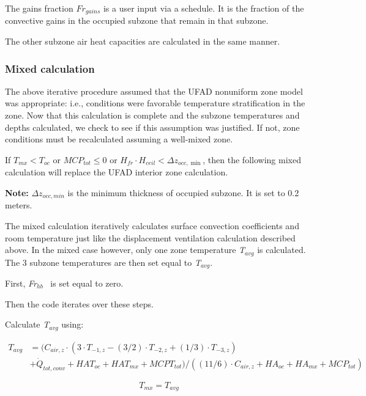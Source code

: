 The gains fraction \(F{r_{gains}}\) is a user input via a schedule. It is the fraction of the convective gains in the occupied subzone that remain in that subzone.

The other subzone air heat capacities are calculated in the same manner.

\subsubsection{Mixed calculation}\label{mixed-calculation-1}

The above iterative procedure assumed that the UFAD nonuniform zone model was appropriate: i.e., conditions were favorable temperature stratification in the zone. Now that this calculation is complete and the subzone temperatures and depths calculated, we check to see if this assumption was justified. If not, zone conditions must be recalculated assuming a well-mixed zone.

If \({T_{mx}} < {T_{oc}}\) or \(MC{P_{tot}} \le 0\) or \({H_{fr}} \cdot {H_{ceil}} < \Delta {z_{occ,\min }}\), then the following mixed calculation will replace the UFAD interior zone calculation.

\textbf{Note:} \(\Delta {z_{occ,min}}\) is the minimum thickness of occupied subzone. It is set to 0.2 meters.

The mixed calculation iteratively calculates surface convection coefficients and room temperature just like the displacement ventilation calculation described above. In the mixed case however, only one zone temperature \emph{T\(_{avg}\)} is calculated. The 3 subzone temperatures are then set equal to \emph{T\(_{avg}\)}.

First, \emph{Fr\(_{hb}\)}~ is set equal to zero.

Then the code iterates over these steps.

Calculate \emph{T\(_{avg}\)} using:

\begin{equation}
  \begin{array}{rl}
    T_{avg} &= ({C_{air,z}} \cdot (3 \cdot {T_{ - 1,z}} - (3/2) \cdot {T_{ - 2,z}} + (1/3) \cdot {T_{ - 3,z}}) \\
            &+ {{\dot Q}_{tot,conv}} + HA{T_{oc}} + HA{T_{mx}} + MCP{T_{tot}})/((11/6) \cdot {C_{air,z}} + H{A_{oc}} + H{A_{mx}} + MC{P_{tot}})
  \end{array}
\end{equation}

\begin{equation}
{T_{mx}} = {T_{avg}}
\end{equation}

